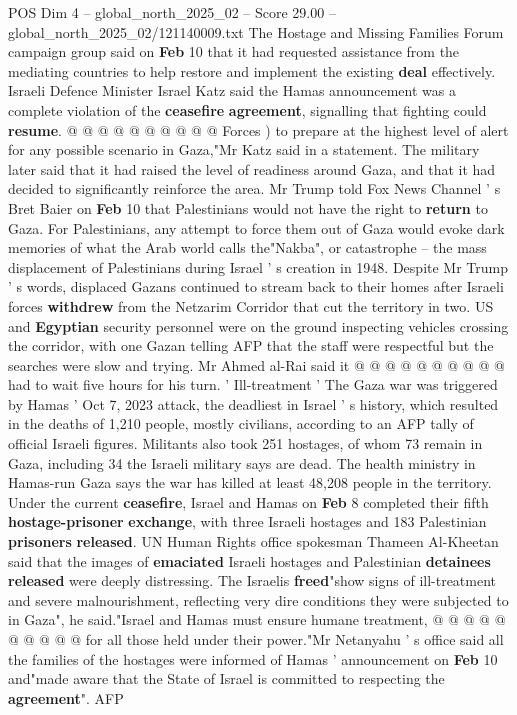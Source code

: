 \begin{textsample}{POS Dim 4 – global\_north\_2025\_02 – Score 29.00 – global\_north\_2025\_02/121140009.txt}
The Hostage and Missing Families Forum campaign group said on \textbf{Feb} 10 that it had requested assistance from the mediating countries to help restore and implement the existing \textbf{deal} effectively.
Israeli Defence Minister Israel Katz said the Hamas announcement was a complete violation of the \textbf{ceasefire} \textbf{agreement}, signalling that fighting could \textbf{resume}. @ @ @ @ @ @ @ @ @ @ Forces ) to prepare at the highest level of alert for any possible scenario in Gaza,"Mr Katz said in a statement.
The military later said that it had raised the level of readiness around Gaza, and that it had decided to significantly reinforce the area.
Mr Trump told Fox News Channel ' s Bret Baier on \textbf{Feb} 10 that Palestinians would not have the right to \textbf{return} to Gaza.
For Palestinians, any attempt to force them out of Gaza would evoke dark memories of what the Arab world calls the"Nakba", or catastrophe -- the mass displacement of Palestinians during Israel ' s creation in 1948.
Despite Mr Trump ' s words, displaced Gazans continued to stream back to their homes after Israeli forces \textbf{withdrew} from the Netzarim Corridor that cut the territory in two.
US and \textbf{Egyptian} security personnel were on the ground inspecting vehicles crossing the corridor, with one Gazan telling AFP that the staff were respectful but the searches were slow and trying.
Mr Ahmed al-Rai said it @ @ @ @ @ @ @ @ @ @ had to wait five hours for his turn. ' Ill-treatment ' The Gaza war was triggered by Hamas ' Oct 7, 2023 attack, the deadliest in Israel ' s history, which resulted in the deaths of 1,210 people, mostly civilians, according to an AFP tally of official Israeli figures.
Militants also took 251 hostages, of whom 73 remain in Gaza, including 34 the Israeli military says are dead.
The health ministry in Hamas-run Gaza says the war has killed at least 48,208 people in the territory.
Under the current \textbf{ceasefire}, Israel and Hamas on \textbf{Feb} 8 completed their fifth \textbf{hostage-prisoner} \textbf{exchange}, with three Israeli hostages and 183 Palestinian \textbf{prisoners} \textbf{released}.
UN Human Rights office spokesman Thameen Al-Kheetan said that the images of \textbf{emaciated} Israeli hostages and Palestinian \textbf{detainees} \textbf{released} were deeply distressing.
The Israelis \textbf{freed}"show signs of ill-treatment and severe malnourishment, reflecting very dire conditions they were subjected to in Gaza", he said."Israel and Hamas must ensure humane treatment, @ @ @ @ @ @ @ @ @ @ for all those held under their power."Mr Netanyahu ' s office said all the families of the hostages were informed of Hamas ' announcement on \textbf{Feb} 10 and"made aware that the State of Israel is committed to respecting the \textbf{agreement}".
AFP

\end{textsample}
